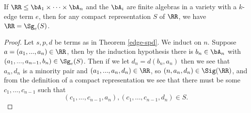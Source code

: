 \begin{thm}\label{edge-gen} If $\RR \le \bA_1 \times \cdots \times \bA_n$ and the $\bA_i$ are finite algebras in a variety with a $k$-edge term $e$, then for any compact representation $S$ of $\RR$, we have $\RR = \Sg_{e}(S)$.
\end{thm}
\begin{proof} Let $s,p,d$ be terms as in Theorem \ref{edge-spd}. We induct on $n$. Suppose $a = (a_1, ..., a_n) \in \RR$, then by the induction hypothesis there is $b_n \in \bA_n$ with $(a_1, ..., a_{n-1}, b_n) \in \Sg_e(S)$. Then if we let $d_n = d(b_n,a_n)$ then we see that $a_n,d_n$ is a minority pair and $(a_1, ..., a_n, d_n) \in \RR$, so $(n,a_n,d_n) \in \Sig(\RR)$, and from the definition of a compact representation we see that there must be some $c_1, ..., c_{n-1}$ such that
\[
(c_1, ..., c_{n-1}, a_n), (c_1, ..., c_{n-1}, d_n) \in S.
\]


\end{proof}

